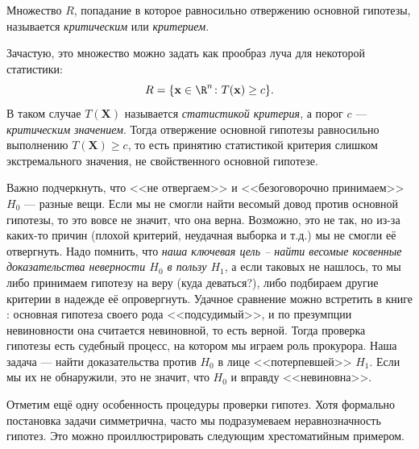 \begin{definition}
Множество $R$, попадание в которое равносильно отвержению основной гипотезы, называется \textit{критическим} или \textit{критерием}.
\end{definition}

Зачастую, это множество можно задать как прообраз луча для некоторой статистики:
\[
R = \{\mathbf{x} \in \R^n\colon T(\mathbf{x}) \ge c\}.
\]
В таком случае $T(\mathbf X)$ называется \textit{статистикой критерия}, а порог $c$ --- \textit{критическим значением}. Тогда отвержение основной гипотезы равносильно выполнению $T(\mathbf X) \ge c$, то есть принятию статистикой критерия слишком экстремального значения, не свойственного основной гипотезе.

Важно подчеркнуть, что <<не отвергаем>> и <<безоговорочно принимаем>> $H_0$ --- разные вещи. Если мы не смогли найти весомый довод против основной гипотезы, то это вовсе не значит, что она верна. Возможно, это не так, но из-за каких-то причин (плохой критерий, неудачная выборка и т.д.) мы не смогли её отвергнуть. Надо помнить, что \textit{наша ключевая цель -- найти весомые косвенные доказательства неверности $H_0$ в пользу $H_1$}, а если таковых не нашлось, то мы либо принимаем гипотезу на веру (куда деваться?), либо подбираем другие критерии в надежде её опровергнуть. Удачное сравнение можно встретить в книге \cite{wasserman}: основная гипотеза своего рода <<подсудимый>>, и по презумпции невиновности она считается невиновной, то есть верной. Тогда проверка гипотезы есть судебный процесс, на котором мы играем роль прокурора. Наша задача --- найти доказательства против $H_0$ в лице <<потерпевшей>> $H_1$. Если мы их не обнаружили, это не значит, что $H_0$ и вправду <<невиновна>>.

Отметим ещё одну особенность процедуры проверки гипотез. Хотя формально постановка задачи симметрична, часто мы подразумеваем неравнозначность гипотез. Это можно проиллюстрировать следующим хрестоматийным примером.

